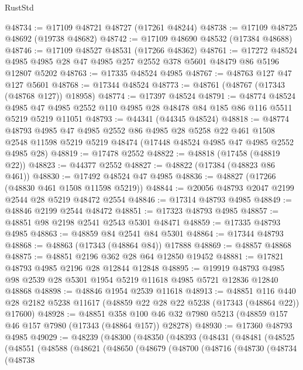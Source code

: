 \begin{lexlean}{RustStd}
\begin{coremodule}
@48734 := @17109 @48721 @48727 (@17261 @48244)
@48738 := @17109 @48725 @48692 (@19738 @48682)
@48742 := @17109 @48690 @48532 (@17384 @48688)
@48746 := @17109 @48527 @48531 (@17266 @48362)
@48761 := @17272
    @48524
    @4985
    @4985
    @28
    @47
    @4985
    @257
    @2552
    @378
    @5601
    @48479
    @86
    @5196
    @12807
    @5202
@48763 := @17335 @48524 @4985
@48767 := @48763 @127 @47 @127 @5601
@48768 := @17344 @48524
@48773 := @48761 (@48767 (@17343 (@48768 @127)) @18958)
@48774 := @17397 @48524
@48791 := @48774
    @48524
    @4985
    @47
    @4985
    @2552
    @110
    @4985
    @28
    @48478
    @84
    @185
    @86
    @116
    @5511
    @5219
    @5219
    @11051
@48793 := @44341 (@44345 @48524)
@48818 := @48774
    @48793
    @4985
    @47
    @4985
    @2552
    @86
    @4985
    @28
    @5258
    @22
    @461
    @1508
    @2548
    @11598
    @5219
    @5219
    @48474
    (@17448 @48524 @4985 @47 @4985 @2552 @4985 @28)
@48819 := @17478 @2552
@48822 := @48818 (@17458 (@48819 @22))
@48823 := @44377 @2552
@48827 := @48822 (@17384 (@48823 @86 @461))
@48830 := @17492 @48524 @47 @4985
@48836 := @48827 (@17266 (@48830 @461 @1508 @11598 @5219))
@48844 := @20056 @48793 @2047 @2199 @2544 @28 @5219 @48472 @2554
@48846 := @17314 @48793 @4985
@48849 := @48846 @2199 @2544 @48472
@48851 := @17323 @48793 @4985
@48857 := @48851 @98 @2198 @2541 @2543 @5301 @48471
@48859 := @17335 @48793 @4985
@48863 := @48859 @84 @2541 @84 @5301
@48864 := @17344 @48793
@48868 := @48863 (@17343 (@48864 @84)) @17888
@48869 := @48857 @48868
@48875 := @48851 @2196 @362 @28 @64 @12850 @19452
@48881 := @17821 @48793 @4985 @2196 @28 @12844 @12848
@48895 := @19919
    @48793
    @4985
    @98
    @2539
    @28
    @5301
    @1954
    @5219
    @11618
    @4985
    @5721
    @12836
    @12840
    @48868
@48898 := @48846 @1954 @2539 @11618
@48913 := @48851
    @116
    @440
    @28
    @2182
    @5238
    @11617
    (@48859 @22 @28 @22 @5238 (@17343 (@48864 @22)) @17600)
@48928 := @48851
    @358
    @100
    @46
    @32
    @7980
    @5213
    (@48859 @157 @46 @157 @7980 (@17343 (@48864 @157)) @28278)
@48930 := @17360 @48793 @4985
@49029 := @48239
    (@48300
      (@48350
        (@48393
          (@48431
            (@48481
              (@48525
                (@48551
                  (@48588
                    (@48621
                      (@48650
                        (@48679
                          (@48700
                            (@48716
                              (@48730
                                (@48734
                                  (@48738

\end{coremodule}
\end{lexlean}
